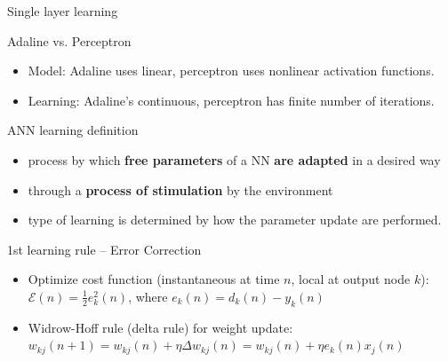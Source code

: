 \documentclass[9pt,t]{beamer}
\begin{document}
\begin{frame}{Single layer learning}
    \begin{alertblock}{Adaline vs. Perceptron}
        \begin{itemize}
            \item Model: Adaline uses linear, perceptron uses nonlinear activation functions.
            \item Learning: Adaline's continuous, perceptron has finite number of iterations.
        \end{itemize}
    \end{alertblock}
    \begin{alertblock}{ANN learning definition}
        \begin{itemize}
            \item process by which \textbf{free parameters} of a NN \textbf{are adapted} in a desired way
            \item through a \textbf{process of stimulation} by the environment
            \item type of learning is determined by how the parameter update are performed.
        \end{itemize}
    \end{alertblock}
    \begin{alertblock}{1st learning rule -- Error Correction}
        \begin{itemize}
            \item Optimize cost function (instantaneous at time $ n $, local at output node $ k $): $ \mathcal{E}(n) = \frac{1}{2} e_k^2(n) $, where $ e_k(n) = d_k(n) - y_k(n) $
            \item Widrow-Hoff rule (delta rule) for weight update: $ w_{kj}(n+1) = w_{kj}(n) + \eta \Delta w_{kj}(n) = w_{kj}(n) + \eta e_k(n) x_j(n) $
        \end{itemize}
    \end{alertblock}
\end{frame}
\end{document}
